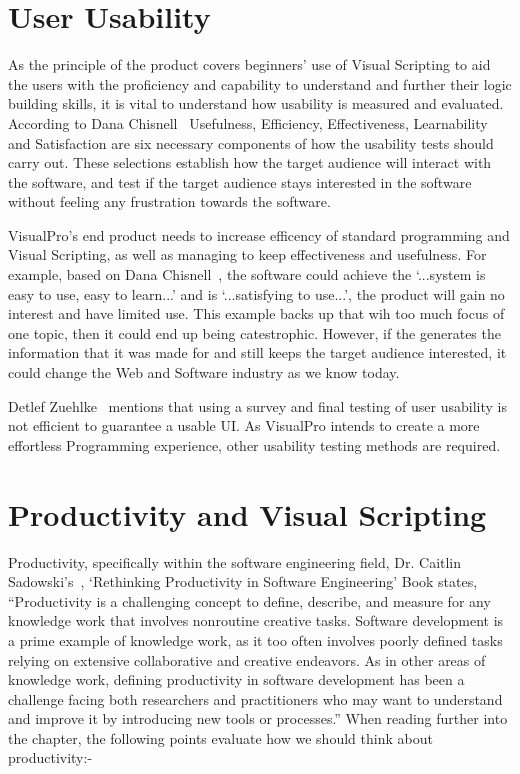 \documentclass[12pt]{report} %
\begin{document}
	\section{User Usability}
		As the principle of the product covers beginners' use of Visual Scripting to aid the users with the proficiency and capability to understand and further their logic building skills, it is vital to understand how usability is measured and evaluated. According to Dana Chisnell~\cite{chisnell_dana_handbook_2008} Usefulness, Efficiency, Effectiveness, Learnability and Satisfaction are six necessary components of how the usability tests should carry out. These selections establish how the target audience will interact with the software, and test if the target audience stays interested in the software without feeling any frustration towards the software. 
		
		VisualPro's end product needs to increase efficency of standard programming and Visual Scripting, as well as managing to keep effectiveness and usefulness. For example, based on Dana Chisnell~\cite{chisnell_dana_handbook_2008}, the software could achieve the `...system is easy to use, easy to learn...' and is `...satisfying to use...', the product will gain no interest and have limited use. This example backs up that wih too much focus of one topic, then it could end up being catestrophic. However, if the generates the information that it was made for and still keeps the target audience interested, it could change the Web and Software industry as we know today.

		Detlef Zuehlke~\cite{zuehlke_useware_2008} mentions that using a survey and final testing of user usability is not efficient to guarantee a usable UI. As VisualPro intends to create a more effortless Programming experience, other usability testing methods are required.
		
	\section{Productivity and Visual Scripting}
		Productivity, specifically within the software engineering field, Dr. Caitlin Sadowski's~\cite{dr_caitlin_sadowski_rethinking_2019}, `Rethinking Productivity in Software Engineering' Book states, ``Productivity is a challenging concept to define, describe, and measure for any knowledge work that involves nonroutine creative tasks. Software development is a prime example of knowledge work, as it too often involves poorly defined tasks relying on extensive collaborative and creative endeavors. As in other areas of knowledge work, defining productivity in software development has been a challenge facing both researchers and practitioners who may want to understand and improve it by introducing new tools or processes.'' When reading further into the chapter, the following points evaluate how we should think about productivity:-
\end{document}
